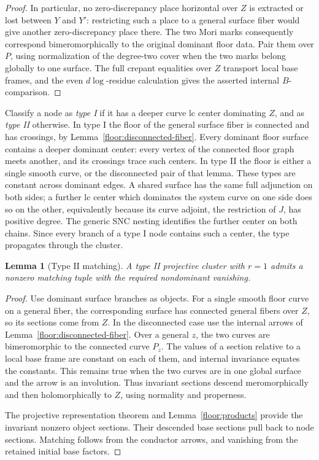 \documentclass[11pt,letterpaper]{article}
\newtheorem{lemma}[theorem]{Lemma}
\theoremstyle{definition}
\theoremstyle{remark}
\begin{document}
\begin{proof}
In particular, no zero-discrepancy place
horizontal over $Z$ is extracted or lost
between $Y$ and $Y'$: restricting such a
place to a general surface fiber would
give another zero-discrepancy place there.
The two Mori marks consequently correspond
bimeromorphically to the original dominant
floor data.  Pair them over $P$, using
normalization of the degree-two cover when
the two marks belong globally to one
surface.  The full crepant equalities over
$Z$ transport local base frames, and the
even $d\log$-residue calculation gives
the asserted internal $B$-comparison.
\end{proof}

Classify a node as \emph{type I} if it has a
deeper curve lc center dominating $Z$, and as
\emph{type II} otherwise.  In type I the floor
of the general surface fiber is connected and
has crossings, by
Lemma~\ref{floor:disconnected-fiber}.  Every
dominant floor surface contains a deeper
dominant center: every vertex of the connected
floor graph meets another, and its crossings
trace such centers.  In type II the floor is
either a single smooth curve, or the
disconnected pair of that lemma.  These types
are constant across dominant edges.  A shared
surface has the same full adjunction on both
sides; a further lc center which dominates
the system curve on one side does so on the
other, equivalently because its curve
adjoint, the restriction of $J$, has positive
degree.  The generic SNC nesting identifies
the further center on both chains.  Since
every branch of a type I node contains such
a center, the type propagates through the
cluster.

\begin{lemma}[Type II matching]
\label{floor:projective-r1-II}
A type II projective cluster with $r=1$
admits a nonzero matching tuple with the
required nondominant vanishing.
\end{lemma}

\begin{proof}
Use dominant surface branches as objects.
For a single smooth floor curve on a
general fiber, the corresponding surface
has connected general fibers over $Z$,
so its sections come from $Z$.  In the
disconnected case use the internal arrows
of Lemma~\ref{floor:disconnected-fiber}.
Over a general $z$, the two curves are
bimeromorphic to the connected curve
$P_z$.  The values of a section relative
to a local base frame are constant on
each of them, and internal invariance
equates the constants.  This remains true
when the two curves are in one global
surface and the arrow is an involution.
Thus invariant sections descend
meromorphically and then holomorphically
to $Z$, using normality and properness.

The projective representation theorem
and Lemma~\ref{floor:products} provide
the invariant nonzero object sections.
Their descended base sections pull back
to node sections.  Matching follows
from the conductor arrows, and vanishing
from the retained initial base factors.
\end{proof}
\end{document}

